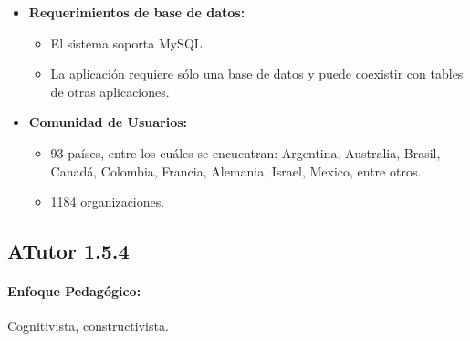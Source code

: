 	\begin{itemize}
		\item \textbf{Requerimientos de base de datos:}
			\begin{itemize}
				\item El sistema soporta MySQL.
				\item La aplicación requiere sólo una base de datos y puede coexistir con tables de otras aplicaciones.
			\end{itemize}
	\end{itemize}
	\begin{itemize}
		\item \textbf{Comunidad de Usuarios:}\\
		\citep{CLA_COM2008}
			\begin{itemize}
				\item 93 países, entre los cuáles se encuentran: Argentina, Australia, Brasil, Canadá, Colombia, Francia, Alemania, Israel, Mexico, entre otros.
				\item 1184 organizaciones.
			\end{itemize}
	\end{itemize}	

\subsection{ATutor 1.5.4}
	\paragraph{Enfoque Pedagógico:} Cognitivista, constructivista.
